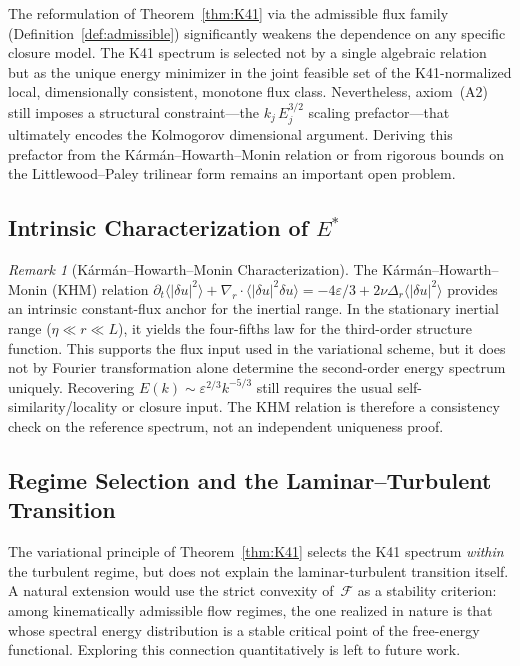 \documentclass[12pt,a4paper]{article}
\theoremstyle{definition}
\theoremstyle{plain}
\theoremstyle{remark}
\newtheorem{remark}[definition]{Remark}
\begin{document}
The reformulation of Theorem~\ref{thm:K41} via the admissible flux
family (Definition~\ref{def:admissible}) significantly weakens the
dependence on any specific closure model.  The K41 spectrum is selected
not by a single algebraic relation but as the unique energy minimizer in
the joint feasible set of the K41-normalized local, dimensionally
consistent, monotone flux class.
Nevertheless, axiom~(A2) still imposes a structural constraint---the
$k_j\,E_j^{3/2}$ scaling prefactor---that ultimately encodes the
Kolmogorov dimensional argument.  Deriving this prefactor from the
Kármán--Howarth--Monin relation or from rigorous bounds on the
Littlewood--Paley trilinear form remains an important open problem.

\subsection{Intrinsic Characterization of \texorpdfstring{$E^*$}{E*}}

\begin{remark}[Kármán--Howarth--Monin Characterization]
\label{rem:khm-intrinsic}
The Kármán--Howarth--Monin (KHM) relation
$\partial_t \langle |\delta u|^2 \rangle + \nabla_r \cdot
\langle |\delta u|^2 \delta u \rangle = -4\varepsilon/3
+ 2\nu \Delta_r \langle |\delta u|^2 \rangle$ provides an intrinsic
constant-flux anchor for the inertial range.  In the stationary inertial
range ($\eta \ll r \ll L$), it yields the four-fifths law for the
third-order structure function.  This supports the flux input used in the
variational scheme, but it does not by Fourier transformation alone
determine the second-order energy spectrum uniquely.  Recovering
$E(k)\sim \varepsilon^{2/3}k^{-5/3}$ still requires the usual
self-similarity/locality or closure input.  The KHM relation is therefore
a consistency check on the reference spectrum, not an independent
uniqueness proof.
\end{remark}

\subsection{Regime Selection and the Laminar--Turbulent Transition}

The variational principle of Theorem~\ref{thm:K41} selects the K41
spectrum \emph{within} the turbulent regime, but does not explain the
laminar-turbulent transition itself.  A natural extension would use the
strict convexity of~$\mathcal{F}$ as a stability criterion: among
kinematically admissible flow regimes, the one realized in nature is
that whose spectral energy distribution is a stable critical point of
the free-energy functional.  Exploring this connection quantitatively
is left to future work.
\end{document}
